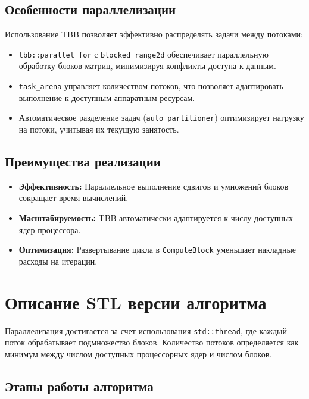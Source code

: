 \documentclass[a4paper,12pt]{article}
\begin{document}
\subsection{Особенности параллелизации}
Использование TBB позволяет эффективно распределять задачи между потоками:
\begin{itemize}
    \item \texttt{tbb::parallel\_for} с \texttt{blocked\_range2d} обеспечивает параллельную обработку блоков матриц, минимизируя конфликты доступа к данным.
    \item \texttt{task\_arena} управляет количеством потоков, что позволяет адаптировать выполнение к доступным аппаратным ресурсам.
    \item Автоматическое разделение задач (\texttt{auto\_partitioner}) оптимизирует нагрузку на потоки, учитывая их текущую занятость.
\end{itemize}

\subsection{Преимущества реализации}
\begin{itemize}
    \item \textbf{Эффективность:} Параллельное выполнение сдвигов и умножений блоков сокращает время вычислений.
    \item \textbf{Масштабируемость:} TBB автоматически адаптируется к числу доступных ядер процессора.
    \item \textbf{Оптимизация:} Развертывание цикла в \texttt{ComputeBlock} уменьшает накладные расходы на итерации.
\end{itemize}

\section{Описание STL версии алгоритма}
Параллелизация достигается за счет использования \texttt{std::thread}, где каждый поток обрабатывает подмножество блоков. Количество потоков определяется как минимум между числом доступных процессорных ядер и числом блоков.

\subsection{Этапы работы алгоритма}
\end{document}
